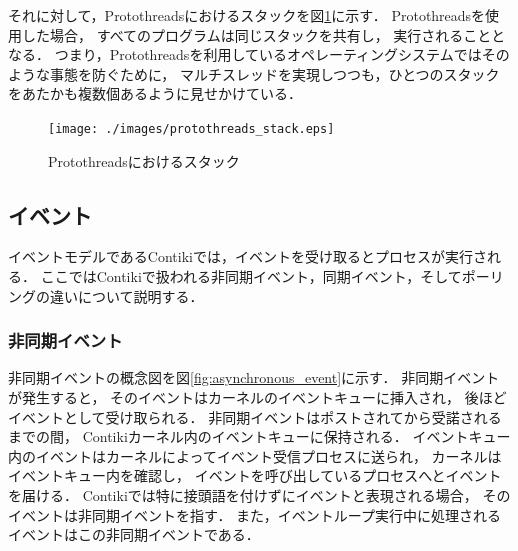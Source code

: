 それに対して，Protothreadsにおけるスタックを図\ref{fig:protothreads_stack}に示す．
Protothreadsを使用した場合，
すべてのプログラムは同じスタックを共有し，
実行されることとなる．
つまり，Protothreadsを利用しているオペレーティングシステムではそのような事態を防ぐために，
マルチスレッドを実現しつつも，ひとつのスタックをあたかも複数個あるように見せかけている．
\begin{figure}[htbp]
 \begin{center}
  \texttt{[image: ./images/protothreads\_stack.eps]}
 \end{center}
 \caption{Protothreadsにおけるスタック}
 \label{fig:protothreads_stack}
\end{figure}



\subsection{イベント}
イベントモデルであるContikiでは，イベントを受け取るとプロセスが実行される．
ここではContikiで扱われる非同期イベント，同期イベント，そしてポーリングの違いについて説明する．

\subsubsection{非同期イベント}\label{sec:asynchronous_event}

\vspace{0.5em}非同期イベントの概念図を図\ref{fig:asynchronous_event}に示す．
非同期イベントが発生すると，
そのイベントはカーネルのイベントキューに挿入され，
後ほどイベントとして受け取られる．
非同期イベントはポストされてから受諾されるまでの間，
Contikiカーネル内のイベントキューに保持される．
イベントキュー内のイベントはカーネルによってイベント受信プロセスに送られ，
カーネルはイベントキュー内を確認し，
イベントを呼び出しているプロセスへとイベントを届ける．
Contikiでは特に接頭語を付けずにイベントと表現される場合，
そのイベントは非同期イベントを指す．
また，イベントループ実行中に処理されるイベントはこの非同期イベントである．

